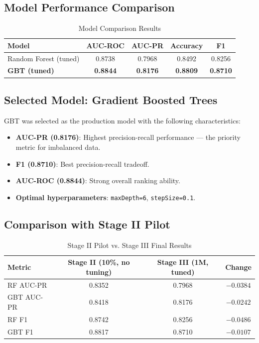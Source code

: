 \subsection{Model Performance Comparison}

\begin{table}[H]
\centering
\caption{Model Comparison Results}
\label{tab:model-comparison}
\begin{tabular}{lcccc}
\toprule
\textbf{Model} & \textbf{AUC-ROC} & \textbf{AUC-PR} & \textbf{Accuracy} & \textbf{F1} \\
\midrule
Random Forest (tuned) & 0.8738 & 0.7968 & 0.8492 & 0.8256 \\
\textbf{GBT (tuned)} & \textbf{0.8844} & \textbf{0.8176} & \textbf{0.8809} & \textbf{0.8710} \\
\bottomrule
\end{tabular}
\end{table}

\subsection{Selected Model: Gradient Boosted Trees}

GBT was selected as the production model with the following characteristics:

\begin{itemize}
    \item \textbf{AUC-PR (0.8176)}: Highest precision-recall performance — the priority metric for imbalanced data.
    \item \textbf{F1 (0.8710)}: Best precision-recall tradeoff.
    \item \textbf{AUC-ROC (0.8844)}: Strong overall ranking ability.
    \item \textbf{Optimal hyperparameters}: \texttt{maxDepth=6}, \texttt{stepSize=0.1}.
\end{itemize}

\subsection{Comparison with Stage II Pilot}

\begin{table}[H]
\centering
\caption{Stage II Pilot vs. Stage III Final Results}
\label{tab:pilot-comparison}
\begin{tabular}{lccc}
\toprule
\textbf{Metric} & \textbf{Stage II (10\%, no tuning)} & \textbf{Stage III (1M, tuned)} & \textbf{Change} \\
\midrule
RF AUC-PR & 0.8352 & 0.7968 & $-0.0384$ \\
GBT AUC-PR & 0.8418 & 0.8176 & $-0.0242$ \\
RF F1 & 0.8742 & 0.8256 & $-0.0486$ \\
GBT F1 & 0.8817 & 0.8710 & $-0.0107$ \\
\bottomrule
\end{tabular}
\end{table}

